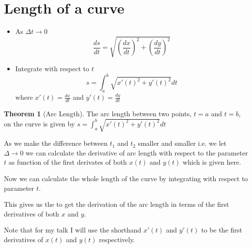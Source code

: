 \documentclass[12pt]{article} %
\theoremstyle{definition}
\theoremstyle{theorem}
\newtheorem{theorem}{Theorem}[section]
\begin{document}
\section{Length of a curve}
\begin{tcolorbox}
	\begin{itemize}
	\item As $\Delta t \to 0$
	\[
		\frac{ds}{dt} = \sqrt{\left( \frac{dx}{dt} \right)^2 + \left( \frac{dy}{dt}\right)^2}
	\]
	\item Integrate with respect to $t$ 
	\[
	s =\int_{a}^{b} \sqrt{x'(t)^2 + y'(t)^2}dt
	\]
	where $x'(t) = \frac{dx}{dt}$ and $y'(t) = \frac{dy}{dt}$
	\end{itemize}
	\begin{theorem}[Arc Length]
		The arc length between two points, $t = a$ and $t = b$, on the curve is given by
		$s =\int_{a}^{b} \sqrt{x'(t)^2 + y'(t)^2}dt$
	\end{theorem}	
\end{tcolorbox}

As we make the difference between $t_1$ and $t_2$ smaller and smaller i.e. we let $\Delta \to 0$ we can calculate the derivative of arc length with respect to the parameter $t$ as function of the first derivates of both $x(t)$ and $y(t)$ which is given here.

Now we can calculate the whole length of the curve by integrating with respect to parameter $t$. 

This gives us the to get the derivation of the arc length in terms of the first derivatives of both $x$ and $y$. 

Note that for my talk I will use the shorthand $x'(t)$ and $y'(t)$ to be the first derivatives of $x(t)$ and $y(t)$ respectively.
\end{document}
